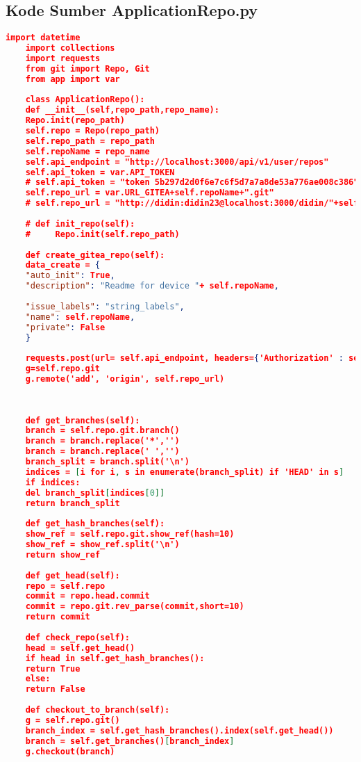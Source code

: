 	\subsection*{Kode Sumber ApplicationRepo.py}
	\begin{lstlisting}[frame=single,tabsize=2,breaklines,caption={Kode sumber ApplicationRepo.py},label=applicationrepo, captionpos=b, language=json]
	import datetime
	import collections
	import requests
	from git import Repo, Git
	from app import var
	
	class ApplicationRepo():
	def __init__(self,repo_path,repo_name):
	Repo.init(repo_path)
	self.repo = Repo(repo_path)
	self.repo_path = repo_path
	self.repoName = repo_name
	self.api_endpoint = "http://localhost:3000/api/v1/user/repos"
	self.api_token = var.API_TOKEN
	# self.api_token = "token 5b297d2d0f6e7c6f5d7a7a8de53a776ae008c386"
	self.repo_url = var.URL_GITEA+self.repoName+".git"
	# self.repo_url = "http://didin:didin23@localhost:3000/didin/"+self.repoName+".git"
	
	# def init_repo(self):
	#     Repo.init(self.repo_path)
	
	def create_gitea_repo(self):
	data_create = {
	"auto_init": True,
	"description": "Readme for device "+ self.repoName,
	
	"issue_labels": "string_labels",
	"name": self.repoName,
	"private": False
	}
	
	requests.post(url= self.api_endpoint, headers={'Authorization' : self.api_token}, data= data_create )
	g=self.repo.git
	g.remote('add', 'origin', self.repo_url)
	
	
	
	def get_branches(self):
	branch = self.repo.git.branch()
	branch = branch.replace('*','')
	branch = branch.replace(' ','')
	branch_split = branch.split('\n')
	indices = [i for i, s in enumerate(branch_split) if 'HEAD' in s]
	if indices:
	del branch_split[indices[0]]
	return branch_split
	
	def get_hash_branches(self):
	show_ref = self.repo.git.show_ref(hash=10)
	show_ref = show_ref.split('\n')
	return show_ref
	
	def get_head(self):
	repo = self.repo
	commit = repo.head.commit
	commit = repo.git.rev_parse(commit,short=10)
	return commit
	
	def check_repo(self):
	head = self.get_head()
	if head in self.get_hash_branches():
	return True
	else:
	return False
	
	def checkout_to_branch(self):
	g = self.repo.git()
	branch_index = self.get_hash_branches().index(self.get_head())
	branch = self.get_branches()[branch_index]
	g.checkout(branch)
	

\end{lstlisting}
